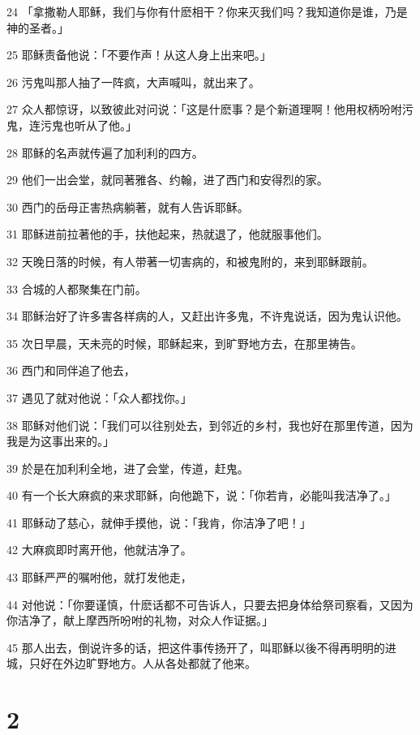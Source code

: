 \par 24 「拿撒勒人耶稣，我们与你有什麽相干？你来灭我们吗？我知道你是谁，乃是神的圣者。」
\par 25 耶稣责备他说：「不要作声！从这人身上出来吧。」
\par 26 污鬼叫那人抽了一阵疯，大声喊叫，就出来了。
\par 27 众人都惊讶，以致彼此对问说：「这是什麽事？是个新道理啊！他用权柄吩咐污鬼，连污鬼也听从了他。」
\par 28 耶稣的名声就传遍了加利利的四方。
\par 29 他们一出会堂，就同著雅各、约翰，进了西门和安得烈的家。
\par 30 西门的岳母正害热病躺著，就有人告诉耶稣。
\par 31 耶稣进前拉著他的手，扶他起来，热就退了，他就服事他们。
\par 32 天晚日落的时候，有人带著一切害病的，和被鬼附的，来到耶稣跟前。
\par 33 合城的人都聚集在门前。
\par 34 耶稣治好了许多害各样病的人，又赶出许多鬼，不许鬼说话，因为鬼认识他。
\par 35 次日早晨，天未亮的时候，耶稣起来，到旷野地方去，在那里祷告。
\par 36 西门和同伴追了他去，
\par 37 遇见了就对他说：「众人都找你。」
\par 38 耶稣对他们说：「我们可以往别处去，到邻近的乡村，我也好在那里传道，因为我是为这事出来的。」
\par 39 於是在加利利全地，进了会堂，传道，赶鬼。
\par 40 有一个长大麻疯的来求耶稣，向他跪下，说：「你若肯，必能叫我洁净了。」
\par 41 耶稣动了慈心，就伸手摸他，说：「我肯，你洁净了吧！」
\par 42 大麻疯即时离开他，他就洁净了。
\par 43 耶稣严严的嘱咐他，就打发他走，
\par 44 对他说：「你要谨慎，什麽话都不可告诉人，只要去把身体给祭司察看，又因为你洁净了，献上摩西所吩咐的礼物，对众人作证据。」
\par 45 那人出去，倒说许多的话，把这件事传扬开了，叫耶稣以後不得再明明的进城，只好在外边旷野地方。人从各处都就了他来。

\chapter{2}


